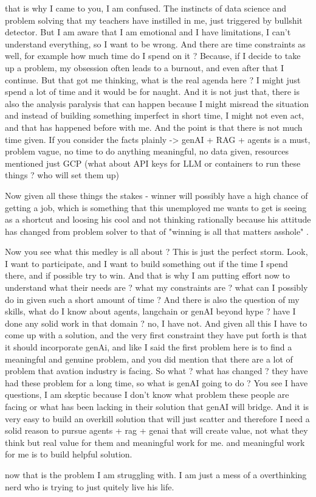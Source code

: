 \begin{userprompt}
that is why I came to you, I am confused. The instincts of data science and problem solving that my teachers have instilled in me, just triggered by bullshit detector. But I am aware that I am emotional and I have limitations, I can't understand everything, so I want to be wrong. And there are time constraints as well, for example how much time do I spend on it ? Because, if I decide to take up a problem, my obsession often leads to a burnout, and even after that I continue. But that got me thinking, what is the real agenda here ? I might just spend a lot of time and it would be for naught. And it is not just that, there is also the analysis paralysis that can happen because I might misread the situation and instead of building something imperfect in short time, I might not even act, and that has happened before with me. And the point is that there is not much time given. If you consider the facts plainly -> genAI + RAG + agents is a must, problem vague, no time to do anything meaningful, no data given, resources mentioned just GCP (what about API keys for LLM or containers to run these things ? who will set them up)

Now given all these things the stakes - winner will possibly have a high chance of getting a job, which is something that this unemployed me wants to get is seeing as a shortcut and loosing his cool and not thinking rationally because his attitude has changed from problem solver to that of "winning is all that matters asshole" .

Now you see what this medley is all about ? This is just the perfect storm. Look, I want to participate, and I want to build something out if the time I spend there, and if possible try to win. And that is why I am putting effort now to understand what their needs are ? what my constraints are ? what can I possibly do in given such a short amount of time ? And there is also the question of my skills, what do I know about agents, langchain or genAI beyond hype ? have I done any solid work in that domain ? no, I have not. And given all this I have to come up with a solution, and the very first constraint they have put forth is that it should incorporate genAi, and like I said the first problem here is to find a meaningful and genuine problem, and you did mention that there are a lot of problem that avation industry is facing. So what ? what has changed ? they have had these problem for a long time, so what is genAI going to do ? You see I have questions, I am skeptic because I don't know what problem these people are facing or what has been lacking in their solution that genAI will bridge. And it is very easy to build an overkill solution that will just scatter and therefore I need a solid reason to pursue agents + rag + genai that will create value, not what they think but real value for them and meaningful work for me. and meaningful work for me is to build helpful solution.

now that is the problem I am struggling with. I am just a mess of a overthinking nerd who is trying to just quitely live his life.
\end{userprompt}

